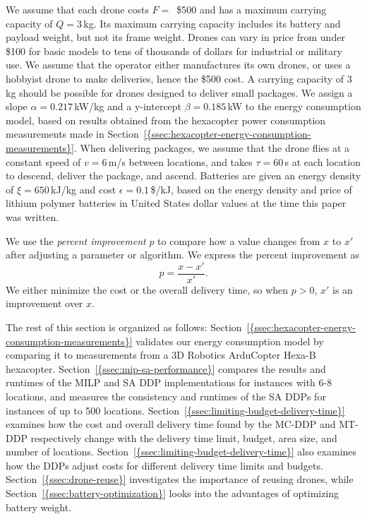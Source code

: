 \documentclass[journal]{IEEEtran}
\begin{document}
We assume that each drone costs ${\ensuremath{F}}=$\ \$500 and has a maximum carrying capacity of ${\ensuremath{Q}}=3$\,kg. Its maximum carrying capacity includes its battery and payload weight, but not its frame weight. Drones can vary in price from under \$100 for basic models to tens of thousands of dollars for industrial or military use. We assume that the operator either manufactures its own drones, or uses a hobbyist drone to make deliveries, hence the \$500 cost. A carrying capacity of 3\,kg should be possible for drones designed to deliver small packages. We assign a slope ${\ensuremath{\alpha}}=0.217$\,kW/kg and a y-intercept ${\ensuremath{\beta}}=0.185$\,kW to the energy consumption model, based on results obtained from the hexacopter power consumption measurements made in {Section~\ref{{ssec:hexacopter-energy-consumption-measurements}}}. When delivering packages, we assume that the drone flies at a constant speed of ${\ensuremath{v}}=6$\,m/s between locations, and takes ${\ensuremath{\tau}}=60$\,s at each location to descend, deliver the package, and ascend. Batteries are given an energy density of ${\ensuremath{\xi}}=650$\,kJ/kg and cost ${\ensuremath{\epsilon}}=0.1$\,\$/kJ, based on the energy density and price of lithium polymer batteries in United States dollar values at the time this paper was written.

We use the \emph{percent improvement} $p$ to compare how a value changes from $x$ to $x'$ after adjusting a parameter or algorithm. We express the percent improvement as
\begin{equation}
p = \frac{x-x'}{x'}.
\end{equation}
We either minimize the cost or the overall delivery time, so when $p>0$, $x'$ is an improvement over $x$.

The rest of this section is organized as follows: {Section~\ref{{ssec:hexacopter-energy-consumption-measurements}}} validates our energy consumption model by comparing it to measurements from a 3D Robotics ArduCopter Hexa-B hexacopter. {Section~\ref{{ssec:mip-sa-performance}}} compares the results and runtimes of the MILP and SA DDP implementations for instances with 6-8 locations, and measures the consistency and runtimes of the SA DDPs for instances of up to 500 locations. {Section~\ref{{ssec:limiting-budget-delivery-time}}} examines how the cost and overall delivery time found by the MC-DDP and MT-DDP respectively change with the delivery time limit, budget, area size, and number of locations. {Section~\ref{{ssec:limiting-budget-delivery-time}}} also examines how the DDPs adjust costs for different delivery time limits and budgets. {Section~\ref{{ssec:drone-reuse}}} investigates the importance of reusing drones, while {Section~\ref{{ssec:battery-optimization}}} looks into the advantages of optimizing battery weight.
\end{document}
